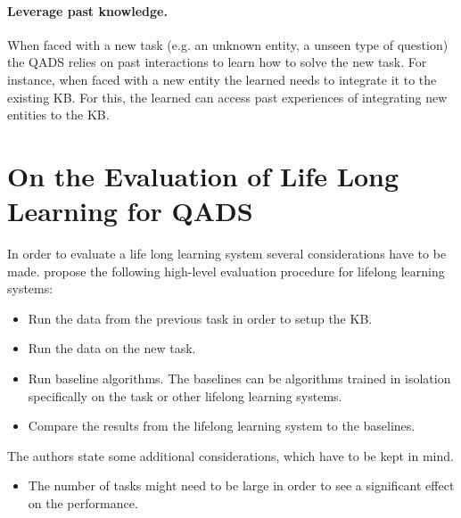 \documentclass{lihlith}
\theoremstyle{definition}
\theoremstyle{remark}
\begin{document}
\paragraph{Leverage past knowledge.} When faced with a new task (e.g. an unknown entity, a unseen type of question) the QADS relies on past interactions to learn how to solve the new task. For instance, when faced with a new entity the learned needs to integrate it to the existing KB. For this, the learned can access past experiences of integrating new entities to the KB.   

\section{On the Evaluation of Life Long Learning for QADS}
In order to evaluate a life long learning system several considerations have to be made. \cite{chen2016lifelong} propose the following high-level evaluation procedure for lifelong learning systems: 
\begin{itemize}
\item Run the data from the previous task in order to setup the KB.
\item Run the data on the new task. 
\item Run baseline algorithms. The baselines can be algorithms trained in isolation specifically on the task or other lifelong learning systems. 
\item Compare the results from the lifelong learning system to the baselines. 
\end{itemize}
The authors state some additional considerations, which have to be kept in mind.
\begin{itemize}
\item The number of tasks might need to be large in order to see a significant effect on the performance. 
\end{itemize}


\clearpage
{}

\end{document}
